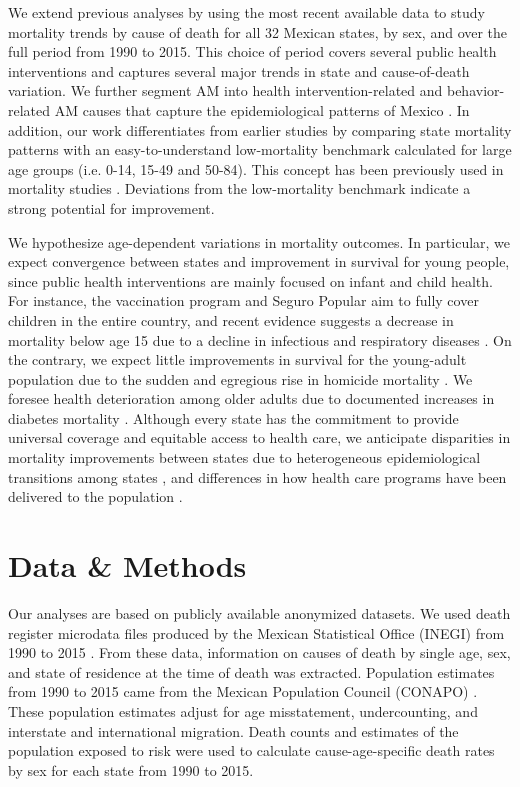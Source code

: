 \documentclass{bmcart}
\begin{document}
We extend previous analyses by using the most recent available data to study mortality trends by cause of death for all 32 Mexican states, by sex, and over the full period from 1990 to 2015. This choice of period covers several public health interventions and captures several major trends in state and cause-of-death variation. We further segment AM into health intervention-related and
behavior-related AM causes that capture the epidemiological patterns of Mexico \cite{Aburto2015}. In addition, our work differentiates from earlier studies by comparing state mortality patterns with an easy-to-understand low-mortality benchmark calculated for large age groups (i.e. 0-14, 15-49 and 50-84). This concept has been previously used in mortality studies \cite{whelpton1947,wunsch1975minimum,vallin2008minimum}. Deviations from the low-mortality benchmark indicate a strong potential for improvement.

We hypothesize age-dependent variations in mortality outcomes.
In particular, we expect convergence between states and improvement in survival
for young people, since public health interventions are mainly focused on infant and child health. For instance, the vaccination program and Seguro Popular aim to fully cover children in the entire country, and recent
evidence suggests a decrease in mortality below age 15 due to a decline
in infectious and respiratory diseases \cite{gonzalez2016mexico}. On the contrary, we
expect little improvements in survival for the young-adult population due to the sudden and egregious rise in homicide mortality \cite{gamlin2015violence}. We foresee health deterioration among older adults due to documented increases in diabetes mortality \cite{gonzalez2016mexico}. Although every
state has the commitment to provide universal coverage and equitable access to health care, we anticipate disparities in mortality improvements between states due to heterogeneous epidemiological transitions among states \cite{gomez2016dissonant}, and differences in how  health care programs have been delivered to the population
\cite{Frenk2006}.


\section*{Data \& Methods} 
Our analyses are based on publicly available anonymized datasets. We used death register microdata files produced by the
Mexican Statistical Office (INEGI) from 1990 to 2015 \cite{INEGI}. From these data, 
information on causes of death by single age, sex, and state of residence at the
time of death was extracted. Population estimates from 1990 to 2015 came from the Mexican Population Council (CONAPO) \cite{CONAPO}. These population estimates  adjust for age misstatement, undercounting, and interstate and international migration. Death counts and estimates of the population exposed to risk were used to calculate cause-age-specific death rates by sex for each state from 1990 to 2015.
\end{document}
